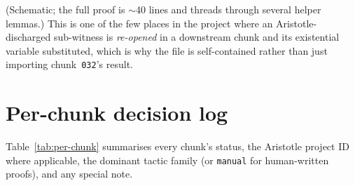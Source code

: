 \documentclass[11pt,a4paper]{article}
\theoremstyle{plain}
\theoremstyle{definition}
\begin{document}
\noindent (Schematic; the full proof is $\sim$40 lines and threads
through several helper lemmas.)  This is one of the few places in the
project where an Aristotle-discharged sub-witness is \emph{re-opened}
in a downstream chunk and its existential variable substituted, which
is why the file is self-contained rather than just importing
chunk~\texttt{032}'s result.

\section{Per-chunk decision log}\label{sec:perchunk}

Table~\ref{tab:per-chunk} summarises every chunk's status, the Aristotle
project ID where applicable, the dominant tactic family (or
\texttt{manual} for human-written proofs), and any special note.
\end{document}
